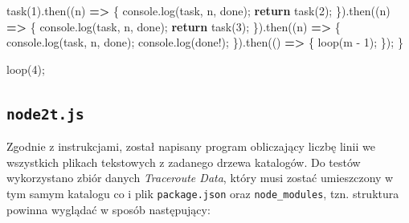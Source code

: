 \documentclass[11pt]{article}
\newenvironment{Shaded}{}{}
\newcommand{\KeywordTok}[1]{\textcolor[rgb]{0.00,0.44,0.13}{\textbf{{#1}}}}
\newcommand{\DecValTok}[1]{\textcolor[rgb]{0.25,0.63,0.44}{{#1}}}
\newcommand{\StringTok}[1]{\textcolor[rgb]{0.25,0.44,0.63}{{#1}}}
\newcommand{\FunctionTok}[1]{\textcolor[rgb]{0.02,0.16,0.49}{{#1}}}
\newcommand{\NormalTok}[1]{{#1}}
\newcommand{\ControlFlowTok}[1]{\textcolor[rgb]{0.00,0.44,0.13}{\textbf{{#1}}}}
\newcommand{\OperatorTok}[1]{\textcolor[rgb]{0.40,0.40,0.40}{{#1}}}
\newcommand{\BuiltInTok}[1]{{#1}}
\begin{document}
\begin{Shaded}
\begin{Highlighting}[]
    \FunctionTok{task}\NormalTok{(}\DecValTok{1}\NormalTok{)}\OperatorTok{.}\FunctionTok{then}\NormalTok{((n) }\KeywordTok{=\textgreater{}}\NormalTok{ \{}
        \BuiltInTok{console}\OperatorTok{.}\FunctionTok{log}\NormalTok{(}\StringTok{\textquotesingle{}task\textquotesingle{}}\OperatorTok{,}\NormalTok{ n}\OperatorTok{,} \StringTok{\textquotesingle{}done\textquotesingle{}}\NormalTok{)}\OperatorTok{;}
        \ControlFlowTok{return} \FunctionTok{task}\NormalTok{(}\DecValTok{2}\NormalTok{)}\OperatorTok{;}
\NormalTok{    \})}\OperatorTok{.}\FunctionTok{then}\NormalTok{((n) }\KeywordTok{=\textgreater{}}\NormalTok{ \{}
        \BuiltInTok{console}\OperatorTok{.}\FunctionTok{log}\NormalTok{(}\StringTok{\textquotesingle{}task\textquotesingle{}}\OperatorTok{,}\NormalTok{ n}\OperatorTok{,} \StringTok{\textquotesingle{}done\textquotesingle{}}\NormalTok{)}\OperatorTok{;}
        \ControlFlowTok{return} \FunctionTok{task}\NormalTok{(}\DecValTok{3}\NormalTok{)}\OperatorTok{;}
\NormalTok{    \})}\OperatorTok{.}\FunctionTok{then}\NormalTok{((n) }\KeywordTok{=\textgreater{}}\NormalTok{ \{}
        \BuiltInTok{console}\OperatorTok{.}\FunctionTok{log}\NormalTok{(}\StringTok{\textquotesingle{}task\textquotesingle{}}\OperatorTok{,}\NormalTok{ n}\OperatorTok{,} \StringTok{\textquotesingle{}done\textquotesingle{}}\NormalTok{)}\OperatorTok{;}
        \BuiltInTok{console}\OperatorTok{.}\FunctionTok{log}\NormalTok{(}\StringTok{\textquotesingle{}done!\textquotesingle{}}\NormalTok{)}\OperatorTok{;}
\NormalTok{    \})}\OperatorTok{.}\FunctionTok{then}\NormalTok{(() }\KeywordTok{=\textgreater{}}\NormalTok{ \{}
        \FunctionTok{loop}\NormalTok{(m }\OperatorTok{{-}} \DecValTok{1}\NormalTok{)}\OperatorTok{;}
\NormalTok{    \})}\OperatorTok{;}
\NormalTok{\}}

\FunctionTok{loop}\NormalTok{(}\DecValTok{4}\NormalTok{)}\OperatorTok{;}
\end{Highlighting}
\end{Shaded}

    \hypertarget{node2t.js}{%
\subsection{\texorpdfstring{\texttt{node2t.js}}{node2t.js}}\label{node2t.js}}

Zgodnie z instrukcjami, został napisany program obliczający liczbę linii
we wszystkich plikach tekstowych z zadanego drzewa katalogów. Do testów
wykorzystano zbiór danych \emph{Traceroute Data}, który musi zostać
umieszczony w tym samym katalogu co i plik \texttt{package.json} oraz
\texttt{node\_modules}, tzn. struktura powinna wyglądać w sposób
następujący:
\end{document}
